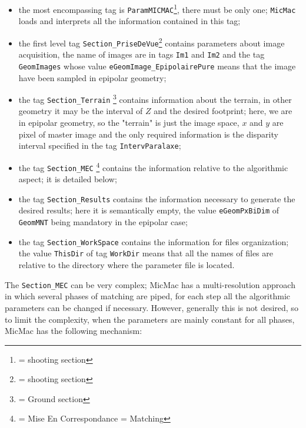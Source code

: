 \begin{itemize}
   \item  the most encompassing tag is {\tt ParamMICMAC}\footnote{= shooting section },
       there must be only one;
          {\tt MicMac} loads and interprets all the information contained in this tag;

   \item the first level tag {\tt Section\_PriseDeVue}\footnote{= shooting section }
         contains parameters about
         image acquisition,  the name of images are in tags
         {\tt Im1} and {\tt Im2} and the tag {\tt GeomImages} whose value
         {\tt eGeomImage\_EpipolairePure} means that the image have been sampled
         in epipolar geometry;

    \item the tag {\tt Section\_Terrain} \footnote{= Ground section} contains information
          about the terrain, in other geometry it may be the interval of $Z$ and the desired
          footprint; here, we are in epipolar geometry, so the "terrain" is just the image space,
          $x$ and $y$ are pixel of master image and the only required information  is the disparity
           interval specified in the tag {\tt IntervParalaxe};


    \item the tag {\tt Section\_MEC} \footnote{= Mise En Correspondance = Matching} contains the
          information relative to the algorithmic aspect; it is detailed below;

    \item  the tag {\tt Section\_Results} contains the information necessary to generate the  desired results; here it is semantically
           empty, the value {\tt eGeomPxBiDim} of {\tt GeomMNT} being mandatory in the epipolar case;

    \item the tag {\tt Section\_WorkSpace} contains the information for files organization;
           the value {\tt ThisDir} of tag {\tt WorkDir} means that all the names of files are
           relative to the directory where the parameter file is located.

\end{itemize}


The  {\tt Section\_MEC} can be very complex; MicMac has a multi-resolution approach in which
several phases of matching are piped, for each step all the algorithmic parameters can be changed if necessary.
However, generally this is not desired, so to limit the complexity,
when the parameters are mainly constant for all phases, MicMac has the following mechanism:


